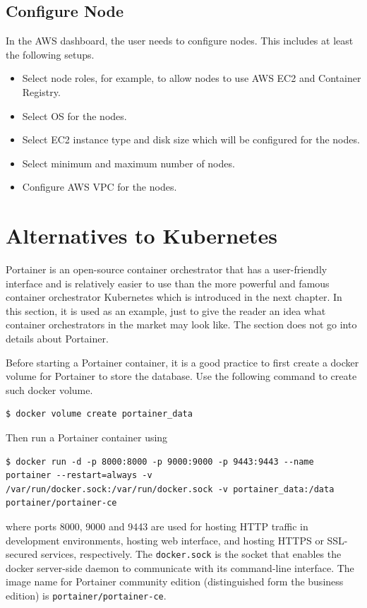 \subsection{Configure Node}

In the AWS dashboard, the user needs to configure nodes. This includes at least the following setups.
\begin{itemize}
  \item Select node roles, for example, to allow nodes to use AWS EC2 and Container Registry.
  \item Select OS for the nodes.
  \item Select EC2 instance type and disk size which will be configured for the nodes.
  \item Select minimum and maximum number of nodes.
  \item Configure AWS VPC for the nodes.
\end{itemize}

\section{Alternatives to Kubernetes}

Portainer is an open-source container orchestrator that has a user-friendly interface and is relatively easier to use than the more powerful and famous container orchestrator Kubernetes which is introduced in the next chapter. In this section, it is used as an example, just to give the reader an idea what container orchestrators in the market may look like. The section does not go into details about Portainer.

Before starting a Portainer container, it is a good practice to first create a docker volume for Portainer to store the database. Use the following command to create such docker volume.
\begin{lstlisting}
$ docker volume create portainer_data
\end{lstlisting}
Then run a Portainer container using
\begin{lstlisting}
$ docker run -d -p 8000:8000 -p 9000:9000 -p 9443:9443 --name portainer --restart=always -v /var/run/docker.sock:/var/run/docker.sock -v portainer_data:/data portainer/portainer-ce
\end{lstlisting}
where ports 8000, 9000 and 9443 are used for hosting HTTP traffic in development environments, hosting web interface, and hosting HTTPS or SSL-secured services, respectively. The \verb|docker.sock| is the socket that enables the docker server-side daemon to communicate with its command-line interface. The image name for Portainer community edition (distinguished form the business edition) is \verb|portainer/portainer-ce|.

